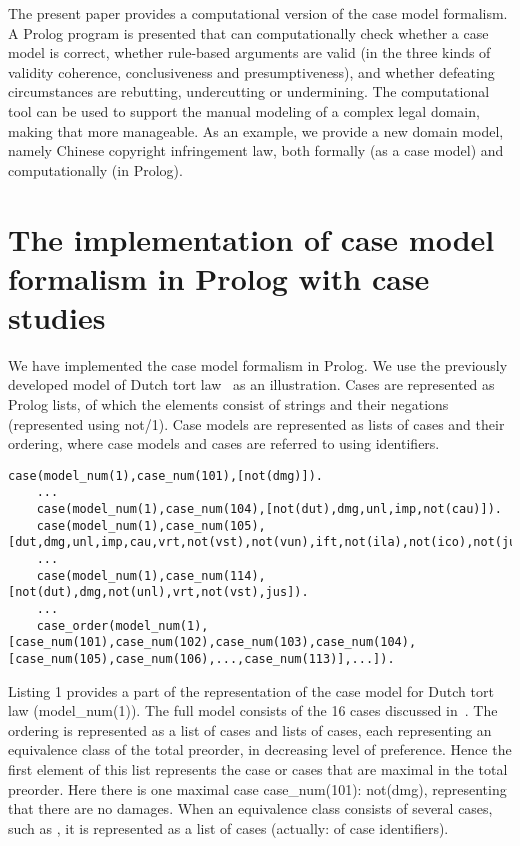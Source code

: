 \documentclass{IOS-Book-Article}
\begin{document}
The present paper provides a computational version of the case model formalism. A Prolog program is presented that can computationally check whether a case model is correct, whether rule-based arguments are valid (in the three kinds of validity coherence, conclusiveness and presumptiveness), and whether defeating circumstances are rebutting, undercutting or undermining. The computational tool can be used to support the manual modeling of a complex legal domain, making that more manageable. As an example, we provide a new domain model, namely Chinese copyright infringement law, both formally (as a case model) and computationally (in Prolog).

\section{The implementation of case model formalism in Prolog with case studies}
\label{sec:cm}

\noindent We have implemented the case model formalism in Prolog. We use the previously developed model of Dutch tort law~\cite{Verheij2017Formalizing} as an illustration. Cases are represented as Prolog lists, of which the elements consist of strings and their negations (represented using {\mf not/1}). Case models are represented as lists of cases and their ordering, where case models and cases are referred to using identifiers. 
	\begin{lstlisting}[caption={Definition of the Dutch tort law case model in Prolog},captionpos=b,float]
	case(model_num(1),case_num(101),[not(dmg)]).
	...
	case(model_num(1),case_num(104),[not(dut),dmg,unl,imp,not(cau)]).
	case(model_num(1),case_num(105),[dut,dmg,unl,imp,cau,vrt,not(vst),not(vun),ift,not(ila),not(ico),not(jus),prp]).
	...
	case(model_num(1),case_num(114),[not(dut),dmg,not(unl),vrt,not(vst),jus]).
	...
	case_order(model_num(1),[case_num(101),case_num(102),case_num(103),case_num(104),[case_num(105),case_num(106),...,case_num(113)],...]).
	\end{lstlisting}

Listing 1 provides a part of the representation of the case model for Dutch tort law ({\mf model\_num(1)}). The full model consists of the 16 cases discussed in~\cite{Verheij2017Formalizing}. The ordering is represented as a list of cases and lists of cases, each representing an equivalence class of the total preorder, in decreasing level of preference. Hence the first element of this list represents the case or cases that are maximal in the total preorder. Here there is one maximal case {\mf case\_num(101): not(dmg)}, representing that there are no damages. When an equivalence class consists of several cases, such as {}, it is represented as a list of cases (actually: of case identifiers).
\end{document}
